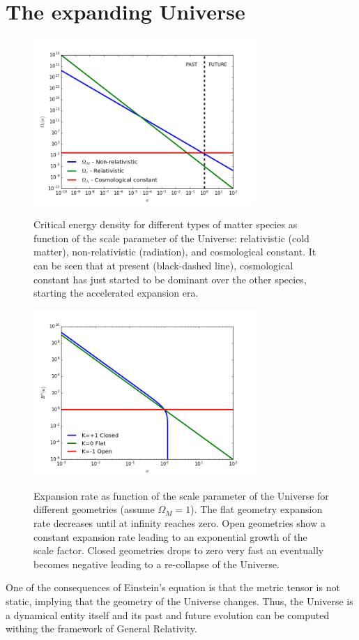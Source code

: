 \section{The expanding Universe}
\begin{figure}
\begin{center}
\includegraphics[width=0.75\textwidth]{./Pictures/rho_a.png}
\caption{Critical energy density for different types of matter species as function of the scale parameter of the Universe: relativistic (cold matter), non-relativistic (radiation), and cosmological constant. It can be seen that at present (black-dashed line), cosmological constant has just started to be dominant over the other species, starting the accelerated expansion era.}
\label{fig:rho_de}
\includegraphics[width=0.75\textwidth]{./Pictures/scale_factor.png}
\caption{Expansion rate as function of the scale parameter of the Universe for different geometries (assume $\Omega_M=1$). The flat geometry expansion rate decreases until at infinity reaches zero. Open geometries show a constant expansion rate leading to an exponential growth of the scale factor. Closed geometries drops to zero very fast an eventually becomes negative leading to a re-collapse of the Universe.}
\label{fig:scale_geometry}
\end{center}
\end{figure}
One of the consequences of Einstein's equation is that the metric tensor is not static, implying that the geometry of the Universe changes. Thus, the Universe is a dynamical entity itself and its past and future evolution can be computed withing the framework of General Relativity.
\newline

